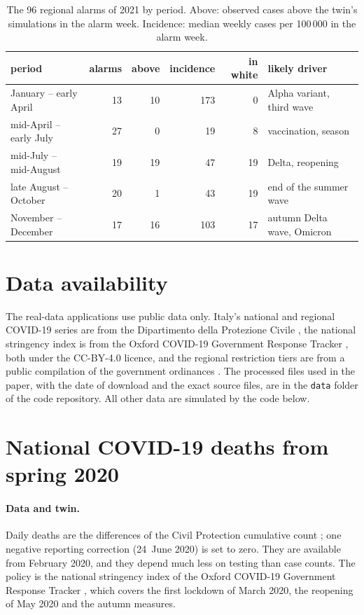 \begin{table}[t]
\centering
\caption{The 96 regional alarms of 2021 by period. Above: observed cases above
the twin's simulations in the alarm week. Incidence: median weekly cases per
100\,000 in the alarm week.}
\label{tab:directions}
\begin{tabular}{lrrrrl}
\toprule
period & alarms & above & incidence & in white & likely driver \\
\midrule
January -- early April & 13 & 10 & 173 & 0 & Alpha variant, third wave \\
mid-April -- early July & 27 & 0 & 19 & 8 & vaccination, season \\
mid-July -- mid-August & 19 & 19 & 47 & 19 & Delta, reopening \\
late August -- October & 20 & 1 & 43 & 19 & end of the summer wave \\
November -- December & 17 & 16 & 103 & 17 & autumn Delta wave, Omicron \\
\bottomrule
\end{tabular}
\end{table}




\section*{Data availability}
The real-data applications use public data only. Italy's national and
regional COVID-19 series are from the Dipartimento della Protezione Civile
\citep{dpc2020covid}, the national stringency index is from the Oxford
COVID-19 Government Response Tracker \citep{hale2021global}, both under the
CC-BY-4.0 licence, and the regional restriction tiers are from a public
compilation of the government ordinances \citep{imcatta2022restrizioni}. The
processed files used in the paper, with the date of download and the exact
source files, are in the \texttt{data} folder of the code repository. All
other data are simulated by the code below.


\section{National COVID-19 deaths from spring 2020}\label{sec:italy-national}

\paragraph{Data and twin.} Daily deaths are the differences of the Civil
Protection cumulative count \citep{dpc2020covid}; one negative reporting
correction (24~June 2020) is set to zero. They are available from February
2020, and they depend much less on testing than case counts. The policy is
the national stringency index of the Oxford COVID-19 Government Response
Tracker \citep{hale2021global}, which covers the first lockdown of March 2020,
the reopening of May 2020 and the autumn measures.

